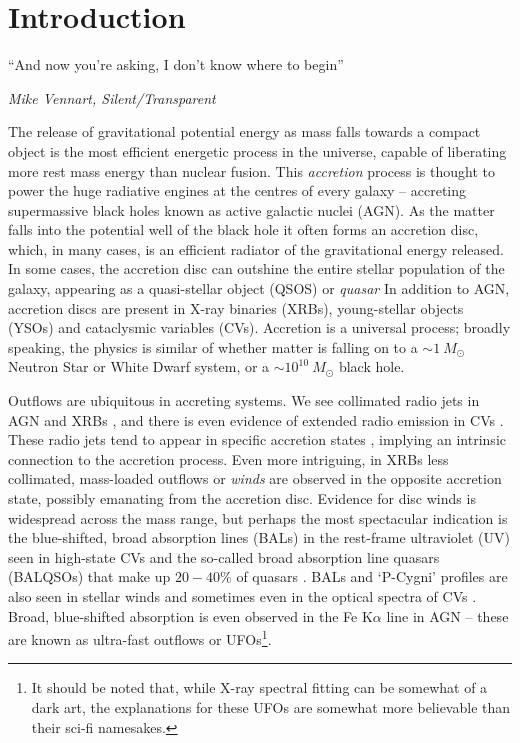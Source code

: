 \chapter{Introduction}

\epigraph{``And now you're asking, I don't know where to begin''}{{\sl Mike Vennart, Silent/Transparent}}
%

The release of gravitational potential energy as mass falls towards
a compact object is the most efficient energetic process in the universe,
capable of liberating more rest mass energy than nuclear fusion.
This {\em accretion} process is thought to power the huge radiative engines at the 
centres of every galaxy -- accreting supermassive black holes known as active galactic nuclei (AGN).
As the matter falls into the potential well of the black hole it often forms an accretion disc,
which, in many cases, is an efficient radiator of the gravitational energy released.
In some cases, the accretion disc can outshine the entire stellar population of the galaxy,
appearing as a quasi-stellar object (QSOS) or {\em quasar} 
In addition to AGN, accretion discs are present in X-ray binaries (XRBs), young-stellar objects (YSOs) and
cataclysmic variables (CVs). Accretion is a universal process; 
broadly speaking, the physics is similar of 
whether matter is falling on to a $\sim1~M_\odot$ Neutron Star or White Dwarf 
system, or a $\sim10^{10}~M_\odot$ black hole. 

Outflows are ubiquitous in accreting systems. We see collimated radio jets in AGN 
\citep{hazard1963,potash1980,perley1984,marscher2006} and XRBs \citep{bellonijet2010}, 
and there is even evidence of extended radio emission in 
CVs \citep{benz1983,coppejans2015}. 
These radio jets tend to appear in specific 
accretion states \citep{fender2001,kordingDNjet2008}, 
implying an intrinsic connection to the 
accretion process. Even more intriguing, in XRBs less collimated, mass-loaded outflows
or {\em winds} are observed in the opposite accretion state, possibly emanating from the accretion disc.
Evidence for disc winds is widespread across the mass range, but perhaps the most spectacular indication
is the blue-shifted, broad absorption lines (BALs) in the rest-frame ultraviolet (UV)
seen in high-state CVs \citep{heap1978,greensteinoke1982,cordova1982}
and the so-called broad absorption line quasars (BALQSOs) that make up $20-40\%$
of quasars \citep{weymann1991,knigge2008,allen2011}. 
BALs and `P-Cygni' profiles \citep{struve1935,rottenburg1952}
are also seen in stellar winds \citep[e.g.][]{cassinelli1979} and sometimes even
in the optical spectra of CVs \citep{patterson1996, RN98, kafka2004}. 
Broad, blue-shifted absorption is even observed in the Fe K$\alpha$ line in 
AGN \citep{reeves2003,poundsreeves2009,tombesi2010a} -- these are known
as ultra-fast outflows or UFOs\footnote{It should be noted that, while X-ray spectral
fitting can be somewhat of a dark art, the explanations for these
UFOs are somewhat more believable than their sci-fi namesakes.}.

